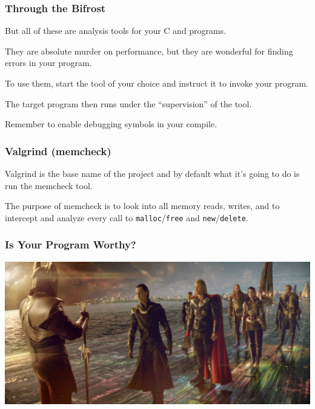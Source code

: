\begin{frame}
	\frametitle{Through the Bifrost}

	But all of these are analysis tools for your C and \CPP programs.

	They are absolute murder on performance, but they are wonderful for finding errors in your program.

	To use them, start the tool of your choice and instruct it to invoke your program.

	The target program then runs under the ``supervision'' of the tool.

	Remember to enable debugging symbols in your compile.

\end{frame}

\begin{frame}
	\frametitle{Valgrind (memcheck)}

	Valgrind is the base name of the project and by default what it's going to do is run the memcheck tool.

	The purpose of memcheck is to look into all memory reads, writes, and to intercept and analyze every call to \texttt{malloc}/\texttt{free} and \texttt{new}/\texttt{delete}.

\end{frame}

\begin{frame}
	\frametitle{Is Your Program Worthy?}

	\begin{center}
		\includegraphics[width=\textwidth]{images/heimdall-waits.jpg}
	\end{center}

\end{frame}


